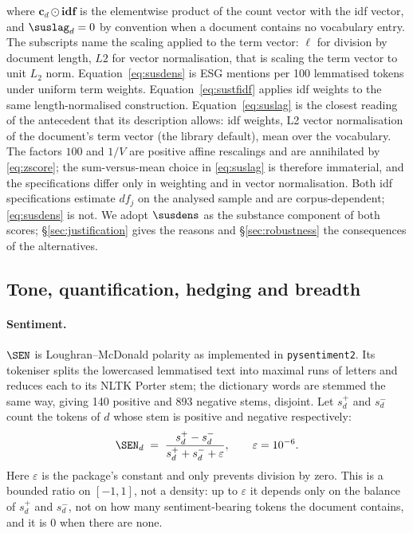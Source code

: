 where $\mathbf{c}_d \odot \mathbf{idf}$ is the elementwise product of the
count vector with the idf vector, and $\suslag_d = 0$ by convention when a
document contains no vocabulary entry. The subscripts name the scaling
applied to the term vector: $\ell$ for division by document length, $L2$ for
vector normalisation, that is scaling the term vector to unit $L_2$ norm.
Equation~\eqref{eq:susdens} is ESG mentions
per 100 lemmatised tokens under uniform term weights.
Equation~\eqref{eq:sustfidf} applies idf weights to the same
length-normalised construction. Equation~\eqref{eq:suslag} is the closest
reading of the antecedent that its description allows: idf weights, L2
vector normalisation of the document's term vector (the library default),
mean over the vocabulary. The factors $100$ and $1/V$ are positive
affine rescalings and are annihilated by \eqref{eq:zscore}; the sum-versus-mean
choice in \eqref{eq:suslag} is therefore immaterial, and the specifications
differ only in weighting and in vector normalisation. Both idf specifications
estimate $df_j$ on the analysed sample and are corpus-dependent;
\eqref{eq:susdens} is not. We adopt $\susdens$ as the substance component of
both scores; \S\ref{sec:justification} gives the reasons and
\S\ref{sec:robustness} the consequences of the alternatives.

\subsection{Tone, quantification, hedging and breadth}
\label{sec:index-components}

\paragraph{Sentiment.} $\SEN$ is Loughran--McDonald polarity
\citep{loughran2011} as implemented in \texttt{pysentiment2}. Its tokeniser
splits the lowercased lemmatised text into maximal runs of letters and
reduces each to its NLTK Porter stem; the dictionary words are stemmed the
same way, giving 140 positive and 893 negative stems, disjoint. Let
$s^{+}_d$ and $s^{-}_d$ count the tokens of $d$ whose stem is positive and
negative respectively:
\begin{equation}
\label{eq:sen}
\SEN_d \;=\; \frac{s^{+}_d - s^{-}_d}{s^{+}_d + s^{-}_d + \varepsilon},
\qquad \varepsilon = 10^{-6}.
\end{equation}
Here $\varepsilon$ is the package's constant and only prevents division by
zero. This is a bounded ratio on
$[-1,1]$, not a density: up to $\varepsilon$ it depends only on the balance of
$s^{+}_d$ and $s^{-}_d$, not on how many sentiment-bearing tokens the document
contains, and it is $0$ when there are none.

